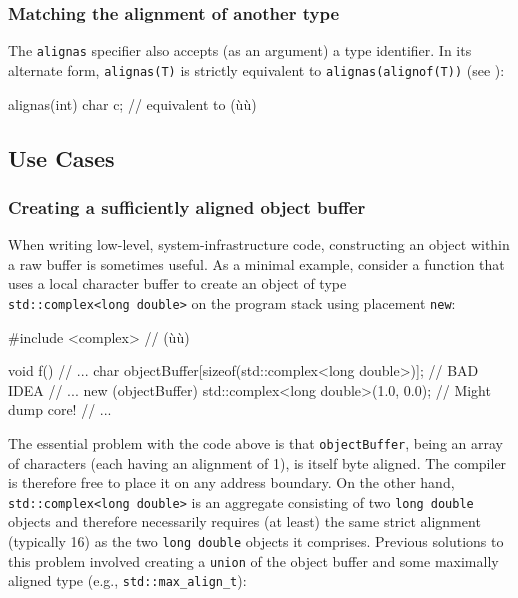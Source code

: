 \subsubsection[Matching the alignment of another type]{Matching the alignment of another type}\label{matching-the-alignment-of-another-type}

The \lstinline!alignas! specifier also accepts (as an argument) a type
identifier. In its alternate form, \lstinline!alignas(T)! is strictly
equivalent to \lstinline!alignas(alignof(T))! (see ):

\begin{emcppslisting}
alignas(int) char c;  // equivalent to (ù{}ù)
\end{emcppslisting}


\subsection[Use Cases]{Use Cases}\label{alignas-use-cases}

\subsubsection[Creating a sufficiently aligned object buffer]{Creating a sufficiently aligned object buffer}\label{creating-a-sufficiently-aligned-object-buffer}

When writing low-level, system-infrastructure code, constructing an object within a raw buffer is sometimes useful. As a minimal
example, consider a function that uses a local character buffer to
create an object of type \lstinline!std::complex<long!~\lstinline!double>! on
the program stack using placement \lstinline!new!:

\begin{emcppslisting}
#include <complex>  // (ù{}ù)

void f()
{
    // ...
    char objectBuffer[sizeof(std::complex<long double>)];  // BAD IDEA
    // ...
    new (objectBuffer) std::complex<long double>(1.0, 0.0);  // Might dump core!
    // ...
}
\end{emcppslisting}

\noindent The essential problem with the code above is that \lstinline!objectBuffer!,
being an array of characters (each having an alignment of 1), is itself
byte aligned. The compiler is therefore free to place it on any address
boundary. On the other hand, \lstinline!std::complex<long!~\lstinline!double>! is an aggregate consisting of two \lstinline!long!~\lstinline!double! objects
and therefore necessarily requires (at least) the same strict alignment
(typically 16) as the two \lstinline!long!~\lstinline!double! objects it comprises. Previous
solutions to this problem involved creating a \lstinline!union! of the
object buffer and some maximally aligned type (e.g.,
\lstinline!std::max_align_t!):

